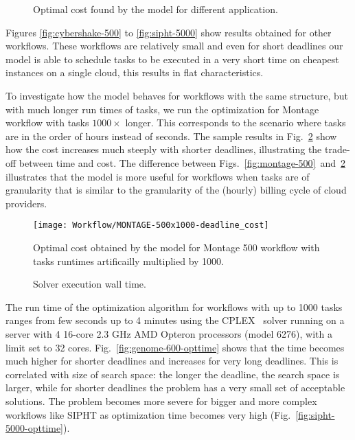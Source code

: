 {\begin{figure}[tb]
       \caption{\label{fig:other}Optimal cost found by the model for different application.}
    \end{figure}	
    
    Figures \ref{fig:cybershake-500} to \ref{fig:sipht-5000}  show results
    obtained for other workflows.
    These workflows are relatively small and even for short deadlines our model
    is able to schedule tasks to be executed in a very short time on cheapest
    instances on a single cloud, this results in flat characteristics.
    
    To investigate how the model behaves for workflows with the same structure,
    but with much longer run times of tasks, we run the optimization for Montage
    workflow with tasks $1000 \times$ longer. This corresponds to the scenario
    where tasks are in the order of hours instead of seconds. The sample results
    in Fig.~\ref{fig:montage-500x1000} show how the cost increases much
    steeply with shorter deadlines, illustrating the trade-off between time and
    cost. The difference between Figs.~\ref{fig:montage-500}~and~\ref{fig:montage-500x1000}
    illustrates that the model is more useful for workflows when tasks are of granularity that is similar to the 
    granularity of the (hourly) billing cycle of cloud providers.
    
    \begin{figure}[tb]
       \centering \texttt{[image: Workflow/MONTAGE-500x1000-deadline\_cost]}
       \caption{Optimal cost obtained by the model for Montage 500 workflow with tasks runtimes artificailly 
       multiplied by 1000.
       \label{fig:montage-500x1000}}
    \end{figure}

    \begin{figure}[tb] 
       \centering
       \caption{Solver execution wall time.}
    \end{figure}
  
    
    The run time of the optimization algorithm for workflows with up to 1000
    tasks ranges from few seconds up to 4 minutes using the CPLEX~\cite{cplex}
    solver running on a server with 4 16-core 2.3 GHz AMD Opteron processors
    (model 6276), with a limit set to 32 cores.
    Fig.~\ref{fig:genome-600-opttime} shows that the time becomes much higher
    for shorter deadlines and increases for very long deadlines. This is
    correlated with size of search space: the longer the deadline, the search
    space is larger, while for shorter deadlines the problem has a very small
    set of acceptable solutions.  The problem becomes more severe for bigger and
    more complex workflows like SIPHT as optimization time becomes very high
    (Fig.~\ref{fig:sipht-5000-opttime}).
    



}
